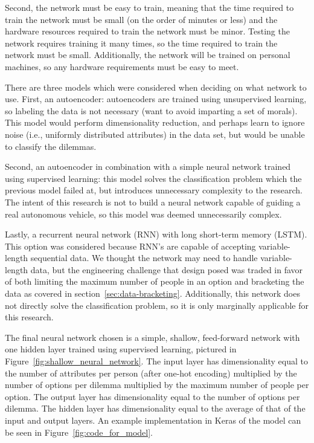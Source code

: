 \documentclass[]{report}
\begin{document}
Second, the network must be easy to train, meaning that the time required to train the network must
be small (on the order of minutes or less) and the hardware resources required to train the network
must be minor. Testing the network requires training it many times, so the time required to train
the network must be small. Additionally, the network will be trained on personal machines, so any
hardware requirements must be easy to meet.

There are three models which were considered when deciding on what network to use. First, an
autoencoder: autoencoders are trained using unsupervised learning, so labeling the data is not
necessary (want to avoid imparting a set of morals). This model would perform dimensionality
reduction, and perhaps learn to ignore noise (i.e., uniformly distributed attributes) in the data
set, but would be unable to classify the dilemmas.

Second, an autoencoder in combination with a simple neural network trained using supervised
learning: this model solves the classification problem which the previous model failed at, but
introduces unnecessary complexity to the research. The intent of this research is not to build a
neural network capable of guiding a real autonomous vehicle, so this model was deemed unnecessarily
complex.

Lastly, a recurrent neural network (RNN) with long short-term memory (LSTM). This option was
considered because RNN's are capable of accepting variable-length sequential data. We thought the
network may need to handle variable-length data, but the engineering challenge that design posed was
traded in favor of both limiting the maximum number of people in an option and bracketing the data
as covered in section~\ref{sec:data-bracketing}. Additionally, this network does not directly solve
the classification problem, so it is only marginally applicable for this research.

The final neural network chosen is a simple, shallow, feed-forward network with one hidden layer
trained using supervised learning, pictured in Figure~\ref{fig:shallow_neural_network}. The input
layer has dimensionality equal to the number of attributes per person (after one-hot encoding)
multiplied by the number of options per dilemma multiplied by the maximum number of people per
option. The output layer has dimensionality equal to the number of options per dilemma. The hidden
layer has dimensionality equal to the average of that of the input and output layers. An example
implementation in Keras of the model can be seen in Figure~\ref{fig:code_for_model}.
\end{document}

